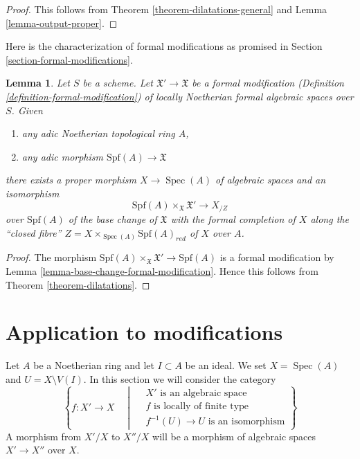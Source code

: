 \documentclass{stacks-project}
\theoremstyle{plain}
\newtheorem{lemma}[subsection]{Lemma}
\theoremstyle{definition}
\theoremstyle{remark}
\numberwithin{equation}{subsection}
\def\Spec{\mathop{\mathrm{Spec}}}
\begin{document}
\begin{proof}
This follows from Theorem \ref{theorem-dilatations-general}
and Lemma \ref{lemma-output-proper}.
\end{proof}

\noindent
Here is the characterization of formal modifications
as promised in Section \ref{section-formal-modifications}.

\begin{lemma}
\label{lemma-formal-modifications-locally-algebraic}
Let $S$ be a scheme. Let $\mathfrak X' \to \mathfrak X$
be a formal modification (Definition \ref{definition-formal-modification})
of locally Noetherian formal algebraic spaces over $S$. Given
\begin{enumerate}
\item any adic Noetherian topological ring $A$,
\item any adic morphism $\text{Spf}(A) \longrightarrow \mathfrak X$
\end{enumerate}
there exists a proper morphism $X \to \Spec(A)$ of algebraic spaces
and an isomorphism
$$
\text{Spf}(A) \times_{\mathfrak X} \mathfrak X'
\longrightarrow
X_{/Z}
$$
over $\text{Spf}(A)$ of the base change of $\mathfrak X$
with the formal completion of $X$ along the ``closed fibre''
$Z = X \times_{\Spec(A)} \text{Spf}(A)_{red}$ of $X$ over $A$.
\end{lemma}

\begin{proof}
The morphism $\text{Spf}(A) \times_{\mathfrak X} \mathfrak X'
\to \text{Spf}(A)$ is a formal modification by
Lemma \ref{lemma-base-change-formal-modification}.
Hence this follows from Theorem \ref{theorem-dilatations}.
\end{proof}







\section{Application to modifications}
\label{section-modifications}

\noindent
Let $A$ be a Noetherian ring and let $I \subset A$ be an ideal. We set
$X = \Spec(A)$ and $U = X \setminus V(I)$. In this section
we will consider the category
\begin{equation}
\label{equation-modification}
\left\{
f : X' \longrightarrow X
\quad \middle| \quad
\begin{matrix}
X'\text{ is an algebraic space}\\
f\text{ is locally of finite type}\\
f^{-1}(U) \to U\text{ is an isomorphism}
\end{matrix}
\right\}
\end{equation}
A morphism from $X'/X$ to $X''/X$ will be a morphism of algebraic spaces
$X' \to X''$ over $X$.
\end{document}
